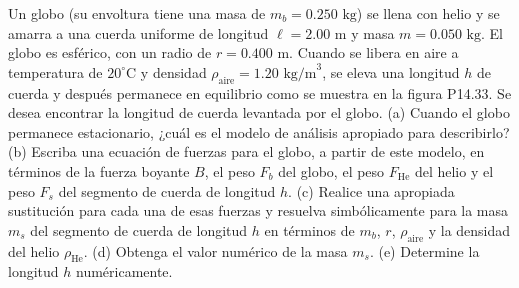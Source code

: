 \item Un globo (su envoltura tiene una masa de $m_b = 0.250 \text{ kg}$) se llena con helio y se amarra a una cuerda uniforme de longitud $\ell = 2.00 \text{ m}$ y masa $m = 0.050 \text{ kg}$. El globo es esférico, con un radio de $r = 0.400 \text{ m}$. Cuando se libera en aire a temperatura de $20^\circ\text{C}$ y densidad $\rho_{\text{aire}} = 1.20 \text{ kg/m}^3$, se eleva una longitud $h$ de cuerda y después permanece en equilibrio como se muestra en la figura P14.33. Se desea encontrar la longitud de cuerda levantada por el globo. (a) Cuando el globo permanece estacionario, ¿cuál es el modelo de análisis apropiado para describirlo? (b) Escriba una ecuación de fuerzas para el globo, a partir de este modelo, en términos de la fuerza boyante $B$, el peso $F_b$ del globo, el peso $F_{\text{He}}$ del helio y el peso $F_s$ del segmento de cuerda de longitud $h$. (c) Realice una apropiada sustitución para cada una de esas fuerzas y resuelva simbólicamente para la masa $m_s$ del segmento de cuerda de longitud $h$ en términos de $m_b$, $r$, $\rho_{\text{aire}}$ y la densidad del helio $\rho_{\text{He}}$. (d) Obtenga el valor numérico de la masa $m_s$. (e) Determine la longitud $h$ numéricamente.
